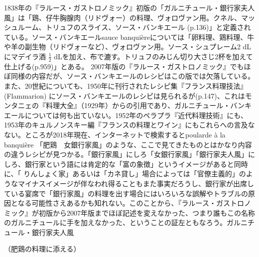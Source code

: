 \begin{recette}
{{{{  1838年の『ラルース・ガストロノミック』初版の「ガルニチュール・銀行家夫人風」は「鶏、仔牛胸腺肉（リドヴォー）の料理、ヴォロヴァン用。クネル、マッシュルーム、トリュフのスライス、ソース・バンキエール
  (p.136)」と定義されている。ソース・バンキエールsauce
  banquièreについては「卵料理、鶏料理、牛や羊の副生物（リドヴォーなど）、ヴォロヴァン用。ソース・シュプレーム2
  dLにマデイラ酒 \(\frac{1}{2}\)
  dLを加え、布で漉す。トリュフのみじん切り大さじ2杯を加えて仕上げる(p.959)」とある。
  2007年版の『ラルース・ガストロノミック』でもほぼ同様の内容だが、ソース・バンキエールのレシピはこの版では欠落している。また、20世紀についても、1950年に刊行されたレシピ集『フランス料理技法』(Flammarion)
  にソース・バンキエールのレシピは見られるが(p.147)、これはモンタニェの『料理大全』（1929年）からの引用であり、ガルニチュール・バンキエールについては何も出ていない。1952年のペラプラ『近代料理技術』にも、
  1953年のキュルノンスキー編『フランスの料理とワイン』にもこれらへの言及なない。ところが2018年現在、インターネットで検索するとpoularde
  à la banquière
  「肥鶏　女銀行家風」のような、ここで見てきたものとはかなり内容の違うレシピが見つかる。「銀行家風」にしろ「女銀行家風」「銀行家夫人風」にしろ、銀行家という語には肯定的な「富の象徴」というイメージがあると同時に、「 {りんしょく}家」あるいは「カネ貸し」場合によっては「官僚主義的」のようなマイナスイメージが伴なわれ得ることもまた事実だろうし、銀行家が出席している宴席で「銀行家風」の料理を出す場合にはいろいろな誤解やトラブルの原因となる可能性さえあるかも知れない。このことから、『ラルース・ガストロノミック』が初版から2007年版までほぼ記述を変えなかった、つまり誰もこの名称のガルニチュールに手を加えなかった、ということの証左ともなろう。}}{ガルニチュール・銀行家夫人風}}\label{garniture-banquiere}}



（肥鶏の料理に添える）


\end{recette}
